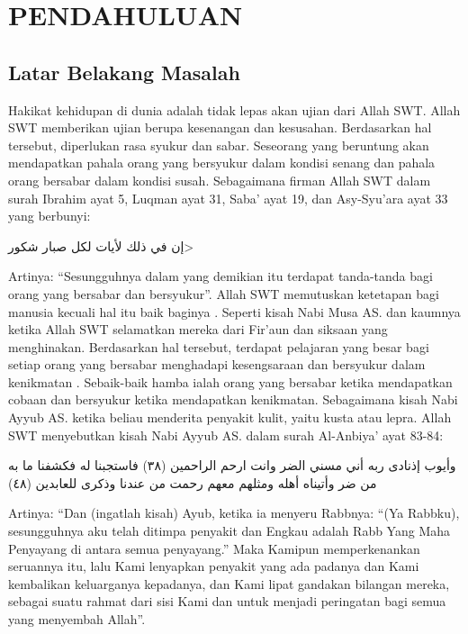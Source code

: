 \chapter{PENDAHULUAN}
    \section{Latar Belakang Masalah}

    Hakikat kehidupan di dunia adalah tidak lepas akan ujian dari Allah SWT. Allah SWT memberikan ujian berupa kesenangan dan kesusahan. Berdasarkan hal tersebut, diperlukan rasa syukur dan sabar. Seseorang yang beruntung akan mendapatkan pahala orang yang bersyukur dalam kondisi senang dan pahala orang bersabar dalam kondisi susah. Sebagaimana firman Allah SWT dalam surah Ibrahim ayat 5, Luqman ayat 31, Saba’ ayat 19, dan Asy-Syu’ara ayat 33 yang berbunyi:

    \begin{flushright}
        \<إن في ذلك لأيات لكل صبار شكور>
    \end{flushright}

    Artinya: “Sesungguhnya dalam yang demikian itu terdapat tanda-tanda bagi orang yang bersabar dan bersyukur”. Allah SWT memutuskan ketetapan bagi manusia kecuali hal itu baik baginya \citep{Ramdhan2019}. Seperti kisah Nabi Musa AS. dan kaumnya ketika Allah SWT selamatkan mereka dari Fir’aun dan siksaan yang menghinakan. Berdasarkan hal tersebut, terdapat pelajaran yang besar bagi setiap orang yang bersabar menghadapi kesengsaraan dan bersyukur dalam kenikmatan \citep{Muaziroh2018}. Sebaik-baik hamba ialah orang yang bersabar ketika mendapatkan cobaan dan bersyukur ketika mendapatkan kenikmatan. Sebagaimana kisah Nabi Ayyub AS. ketika beliau menderita penyakit kulit, yaitu kusta atau lepra. Allah SWT menyebutkan kisah Nabi Ayyub AS. dalam surah Al-Anbiya’ ayat 83-84:

    \begin{flushright}
        \begin{RLtext}
            وأيوب إذنادى ربه أني مسني الضر وانت ارحم الراحمين (٣٨) فاستجبنا له فكشفنا ما به من ضر وأتيناه أهله ومثلهم معهم رحمت من عندنا وذكرى للعابدين (٤٨)
        \end{RLtext}
    \end{flushright}

    Artinya: “Dan (ingatlah kisah) Ayub, ketika ia menyeru Rabbnya: “(Ya Rabbku), sesungguhnya aku telah ditimpa penyakit dan Engkau adalah Rabb Yang Maha Penyayang di antara semua penyayang.” Maka Kamipun memperkenankan seruannya itu, lalu Kami lenyapkan penyakit yang ada padanya dan Kami kembalikan keluarganya kepadanya, dan Kami lipat gandakan bilangan mereka, sebagai suatu rahmat dari sisi Kami dan untuk menjadi peringatan bagi semua yang menyembah Allah”.

